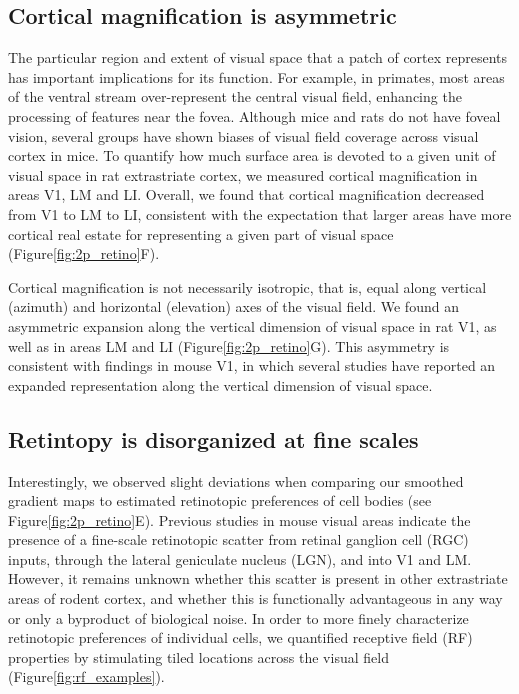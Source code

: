 \subsection{Cortical magnification is asymmetric}
The particular region and extent of visual space that a patch of cortex represents has important implications for its function. For example, in primates, most areas of the ventral stream over-represent the central visual field, enhancing the processing of features near the fovea\cite{REFREF, Gattass2005CorticalDynamics}. Although mice and rats do not have foveal vision, several groups have shown biases of visual field coverage across visual cortex in mice\cite{Garrett2014, Marshel2011, REFREF}. To quantify how much surface area is devoted to a given unit of visual space in rat extrastriate cortex, we measured cortical magnification in areas V1, LM and LI. Overall, we found that cortical magnification decreased from V1 to LM to LI, consistent with the expectation that larger areas have more cortical real estate for representing a given part of visual space (Figure\ref{fig:2p_retino}F). 

Cortical magnification is not necessarily isotropic, that is, equal along vertical (azimuth) and horizontal (elevation) axes of the visual field. We found an asymmetric expansion along the vertical dimension of visual space in rat V1, as well as in areas LM and LI (Figure\ref{fig:2p_retino}G). This asymmetry is consistent with findings in mouse V1, in which several studies have reported an expanded representation along the vertical dimension of visual space\cite{Garrett2014, Liang2018, Bonin2011}.  

\subsection{Retintopy is disorganized at fine scales}
Interestingly, we observed slight deviations when comparing our smoothed gradient maps to estimated retinotopic preferences of cell bodies (see Figure\ref{fig:2p_retino}E). Previous studies in mouse visual areas indicate the presence of a fine-scale retinotopic scatter from retinal ganglion cell (RGC) inputs, through the lateral geniculate nucleus (LGN), and into V1 and LM\cite{Liang2018, Andermann2011, Marques2018}. However, it remains unknown whether this scatter is present in other extrastriate areas of rodent cortex, and whether this is functionally advantageous in any way or only a byproduct of biological noise. In order to more finely characterize retinotopic preferences of individual cells, we quantified receptive field (RF) properties by stimulating tiled locations across the visual field (Figure\ref{fig:rf_examples}). 

